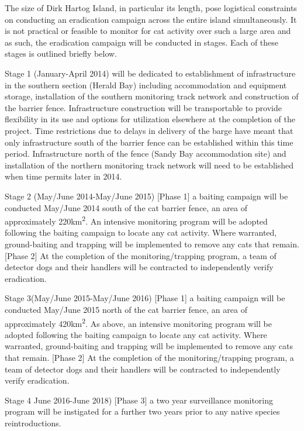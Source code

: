 \documentclass[version=last,
    paper=a4,                               %
    10pt,                                   %
    dvipsnames,
    oneside,                              %
    headings=openany,                       %
    open=any,
    BCOR=7mm,                               %
    DIV=15,     %
]{scrbook}
\begin{document}
The size of Dirk Hartog Island, in particular its length, pose
logistical constraints on conducting an eradication campaign across the
entire island simultaneously. It is not practical or feasible to monitor
for cat activity over such a large area and as such, the eradication
campaign will be conducted in stages. Each of these stages is outlined
briefly below.

Stage 1 (January-April 2014) will be dedicated to establishment of
infrastructure in the southern section (Herald Bay) including
accommodation and equipment storage, installation of the southern
monitoring track network and construction of the barrier fence.
Infrastructure construction will be transportable to provide flexibility
in its use and options for utilization elsewhere at the completion of
the project. Time restrictions due to delays in delivery of the barge
have meant that only infrastructure south of the barrier fence can be
established within this time period. Infrastructure north of the fence
(Sandy Bay accommodation site) and installation of the northern
monitoring track network will need to be established when time permits
later in 2014.

Stage 2 (May/June 2014-May/June 2015) {[}Phase 1{]} a baiting campaign
will be conducted May/June 2014 south of the cat barrier fence, an area
of approximately 220km\textsuperscript{2}. An intensive monitoring
program will be adopted following the baiting campaign to locate any cat
activity. Where warranted, ground-baiting and trapping will be
implemented to remove any cats that remain. {[}Phase 2{]} At the
completion of the monitoring/trapping program, a team of detector dogs
and their handlers will be contracted to independently verify
eradication.

Stage 3(May/June 2015-May/June 2016) {[}Phase 1{]} a baiting campaign
will be conducted May/June 2015 north of the cat barrier fence, an area
of approximately 420km\textsuperscript{2}. As above, an intensive
monitoring program will be adopted following the baiting campaign to
locate any cat activity. Where warranted, ground-baiting and trapping
will be implemented to remove any cats that remain. {[}Phase 2{]} At the
completion of the monitoring/trapping program, a team of detector dogs
and their handlers will be contracted to independently verify
eradication.

Stage 4 June 2016-June 2018) {[}Phase 3{]} a two year surveillance
monitoring program will be instigated for a further two years prior to
any native species reintroductions.
\end{document}
